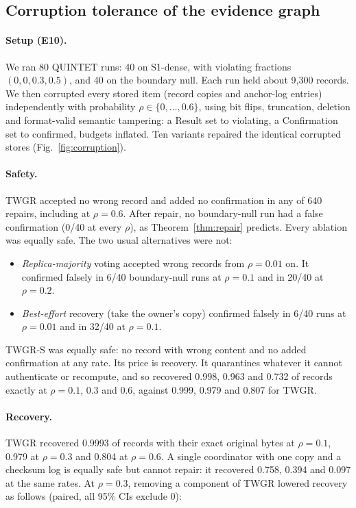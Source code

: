 \documentclass[pdflatex,sn-mathphys-num]{sn-jnl}
\theoremstyle{thmstyleone}
\theoremstyle{thmstyletwo}
\theoremstyle{thmstylethree}
\begin{document}
\subsection{Corruption tolerance of the evidence graph}\label{sec:corruption}
\paragraph{Setup (E10).} We ran 80 QUINTET runs: 40 on S1-dense, with violating fractions $(0,0,0.3,0.5)$, and 40 on the boundary null. Each run held about 9{,}300 records. We then corrupted every stored item (record copies and anchor-log entries) independently with probability $\rho\in\{0,\dots,0.6\}$, using bit flips, truncation, deletion and format-valid semantic tampering: a Result set to violating, a Confirmation set to confirmed, budgets inflated. Ten variants repaired the identical corrupted stores (Fig.~\ref{fig:corruption}).

\paragraph{Safety.} TWGR accepted no wrong record and added no confirmation in any of 640 repairs, including at $\rho=0.6$. After repair, no boundary-null run had a false confirmation (0/40 at every $\rho$), as Theorem~\ref{thm:repair} predicts. Every ablation was equally safe. The two usual alternatives were not:
\begin{itemize}
\item \emph{Replica-majority} voting accepted wrong records from $\rho=0.01$ on. It confirmed falsely in 6/40 boundary-null runs at $\rho=0.1$ and in 20/40 at $\rho=0.2$.
\item \emph{Best-effort} recovery (take the owner's copy) confirmed falsely in 6/40 runs at $\rho=0.01$ and in 32/40 at $\rho=0.1$.
\end{itemize}
TWGR-S was equally safe: no record with wrong content and no added confirmation at any rate. Its price is recovery. It quarantines whatever it cannot authenticate or recompute, and so recovered 0.998, 0.963 and 0.732 of records exactly at $\rho=0.1$, 0.3 and 0.6, against 0.999, 0.979 and 0.807 for TWGR.

\paragraph{Recovery.} TWGR recovered 0.9993 of records with their exact original bytes at $\rho=0.1$, 0.979 at $\rho=0.3$ and 0.804 at $\rho=0.6$. A single coordinator with one copy and a checksum log is equally safe but cannot repair: it recovered 0.758, 0.394 and 0.097 at the same rates. At $\rho=0.3$, removing a component of TWGR lowered recovery as follows (paired, all 95\% CIs exclude 0):
\end{document}
